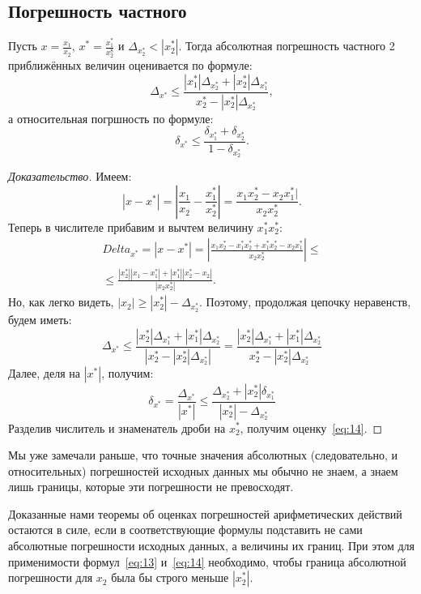 \subsection{Погрешность частного}
\begin{theorem}
	Пусть $x = \frac{x_1}{x_2}$, $x^* = \frac{x^*_1}{x^8_2}$ и
	$\Delta_{x^*_2} < |x^*_2|$. Тогда абсолютная погрешность частного 2
	приближённых величин оценивается по формуле:
	\begin{equation}
		\Delta_{x^*} \leq \frac{|x^*_1| \Delta_{x^*_2} + |x^*_2|
		\Delta_{x^*_1}}{x^*_2 - |x^*_2| \Delta_{x^*_2}},
		\label{eq:13}
	\end{equation}
	а относительная погршность по формуле:
	\begin{equation}
		\delta_{x^*} \leq \frac{\delta_{x^*_1} + \delta_{x^*_2}}{1 -
		\delta_{x^*_2}}.
		\label{eq:14}
	\end{equation}
\end{theorem}
\begin{proof}[Доказательство]
	Имеем:
	$$|x - x^*| = |\frac{x_1}{x_2} - \frac{x^*_1}{x^*_2}| = \frac{x_1
	x^*_2 - x_2 x^*_1|}{x_2 x^*_2}.$$
	Теперь в числителе прибавим и вычтем величину $x^*_1 x^*_2$:
	\begin{equation}
		\begin{split}
			Delta_{x^*} = |x - x^*| =
			|\frac{x_1 x^*_2 - x^*_1 x^*_2 + x^*_1 x^*_2 - x_2
			x^*_1}{x_2 x^*_2}| \leq \\
			\leq \frac{|x^*_2| |x_1 - x^*_1| + |x^*_1| |x^*_2 -
			x_2|}{|x_2 x^*_2|}.
		\end{split}
	\end{equation}
	Но, как легко видеть, $|x_2| \geq |x^*_2| - \Delta_{x^*_2}$. Поэтому,
	продолжая цепочку неравенств, будем иметь:
	$$\Delta_{x^*} \leq \frac{|x^*_2| \Delta_{x^*_1} + |x^*_1|
	\Delta_{x^*_2}}{|x^*_2 - |x^*_2| \Delta_{x^*_2}|} =
	\frac{|x^*_2| \Delta_{x^*_1} + |x^*_1| \Delta_{x^*_2}}{x^*_2 - |x^*_2|
	\Delta_{x^*_2}}$$
	Далее, деля на $|x^*|$, получим:
	$$\delta_{x^*} = \frac{\Delta_{x^*}}{|x^*|} \leq
	\frac{\Delta_{x^*_2} + |x^*_2| \delta_{x^*_1}}{|x^*_2| -
	\Delta_{x^*_2}}$$
	Разделив числитель и знаменатель дроби на $x^*_2$, получим
	оценку~\ref{eq:14}.
\end{proof}
Мы уже замечали раньше, что точные значения абсолютных (следовательно, и
относительных) погрешностей исходных данных мы обычно не знаем, а знаем лишь
границы, которые эти погрешности не превосходят.

Доказанные нами теоремы об оценках погрешностей арифметических действий
остаются в силе, если в соответствующие формулы подставить не сами абсолютные
погрешности исходных данных, а величины их границ. При этом для применимости
формул~\ref{eq:13} и~\ref{eq:14} необходимо, чтобы граница абсолютной
погрешности для $x_2$ была бы строго меньше $|x^*_2|$.

